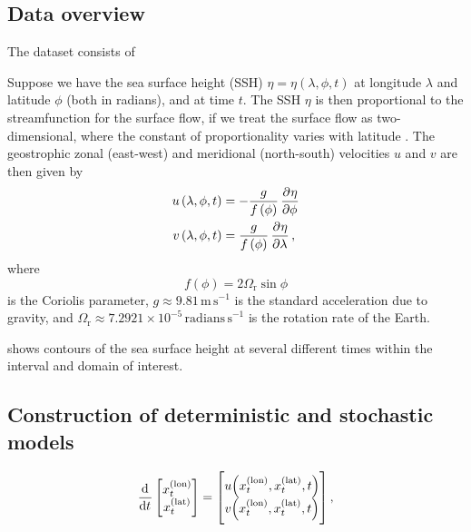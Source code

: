\subsection{Data overview}
The dataset consists of

Suppose we have the sea surface height (SSH) \(\eta = \eta\left(\lambda, \phi, t\right)\) at longitude \(\lambda\) and latitude \(\phi\) (both in radians), and at time \(t\).
The SSH \(\eta\) is then proportional to the streamfunction for the surface flow, if we treat the surface flow as two-dimensional, where the constant of proportionality varies with latitude \citep{Park_2004_DeterminationSurfaceGeostrophic, DoglioniEtAl_2021_SeaSurfaceHeight}.
The geostrophic zonal (east-west) and meridional (north-south) velocities \(u\) and \(v\) are then given by
\begin{subequations}\label{eqn:}
	\begin{align}
		u\left(\lambda, \phi, t\right) & = -\frac{g}{f\left(\phi\right)}\dpd{\eta}{\phi} \label{eqn:altimetry_u}    \\
		v\left(\lambda, \phi, t\right) & = \frac{g}{f\left(\phi\right)}\dpd{\eta}{\lambda} \label{eqn:altimetry_v},
	\end{align}
\end{subequations}
\label{eqn:altimetry_uv}
where
\[
	f\left(\phi\right) = 2\Omega_{\mathrm{r}}\sin{\phi}
\]
is the Coriolis parameter, \(g \approx 9.81\mathrm{\,m\,s}^{-1}\) is the standard acceleration due to gravity, and \(\Omega_\mathrm{r} \approx 7.2921 \times 10^{-5}\mathrm{\,radians\,s}^{-1}\) is the rotation rate of the Earth.


 shows contours of the sea surface height at several different times within the interval and domain of interest.

\begin{figure}
	\begin{center}
		\caption{}
		\label{fig:na_snapshots}
	\end{center}
\end{figure}





\subsection{Construction of deterministic and stochastic models}


\begin{equation}\label{eqn:natl_ode}
	\dod{}{t}\begin{bmatrix}
		x_t^{(\text{lon})} \\ x_t^{(\text{lat})}
	\end{bmatrix} = \begin{bmatrix}
		u\!\left(x^{(\mathrm{lon})}_t, x^{(\mathrm{lat})}_t, t\right) \\ v\!\left(x^{(\mathrm{lon})}_t, x^{(\mathrm{lat})}_t, t\right)
	\end{bmatrix},
\end{equation}


